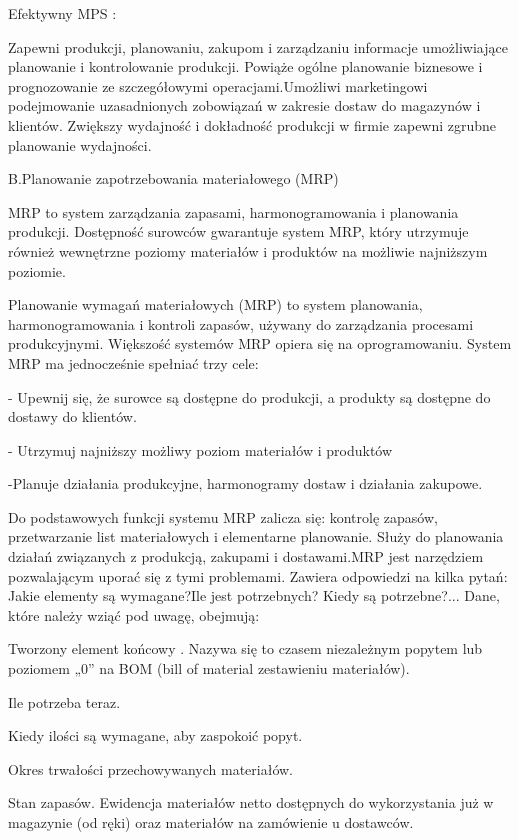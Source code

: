 Efektywny MPS :
 
Zapewni produkcji, planowaniu, zakupom i zarządzaniu informacje umożliwiające planowanie i kontrolowanie produkcji. Powiąże ogólne planowanie biznesowe i prognozowanie ze szczegółowymi operacjami.Umożliwi marketingowi podejmowanie uzasadnionych zobowiązań w zakresie dostaw do magazynów i klientów. Zwiększy wydajność i dokładność produkcji w firmie zapewni zgrubne planowanie wydajności.

B.Planowanie zapotrzebowania materiałowego (MRP)

MRP to system zarządzania zapasami, harmonogramowania i planowania produkcji. Dostępność surowców gwarantuje system MRP, który utrzymuje również wewnętrzne poziomy materiałów i produktów na możliwie najniższym poziomie.

Planowanie wymagań materiałowych (MRP) to system planowania, harmonogramowania i kontroli zapasów, używany do zarządzania procesami produkcyjnymi. Większość systemów MRP opiera się na oprogramowaniu.
System MRP ma jednocześnie spełniać trzy cele:

     - Upewnij się, że surowce są dostępne do produkcji, a produkty są dostępne do dostawy do klientów.
     
    - Utrzymuj najniższy możliwy poziom materiałów i produktów 
    
     -Planuje działania produkcyjne, harmonogramy dostaw i działania zakupowe.

 Do podstawowych funkcji systemu MRP zalicza się: kontrolę zapasów, przetwarzanie list materiałowych i elementarne planowanie.  Służy do planowania działań związanych z produkcją, zakupami i dostawami.MRP jest narzędziem pozwalającym uporać się z tymi problemami. Zawiera odpowiedzi na kilka pytań: Jakie elementy są wymagane?Ile jest potrzebnych? Kiedy są potrzebne?...    
 Dane, które należy wziąć pod uwagę, obejmują:

     Tworzony element końcowy . Nazywa się to czasem niezależnym popytem lub poziomem „0” na BOM (bill of material zestawieniu materiałów).
     
     Ile potrzeba teraz.
     
     Kiedy ilości są wymagane, aby zaspokoić popyt.
     
     Okres trwałości przechowywanych materiałów.
     
     Stan zapasów. Ewidencja materiałów netto dostępnych do wykorzystania już w magazynie (od ręki) oraz materiałów na zamówienie u dostawców.
     
